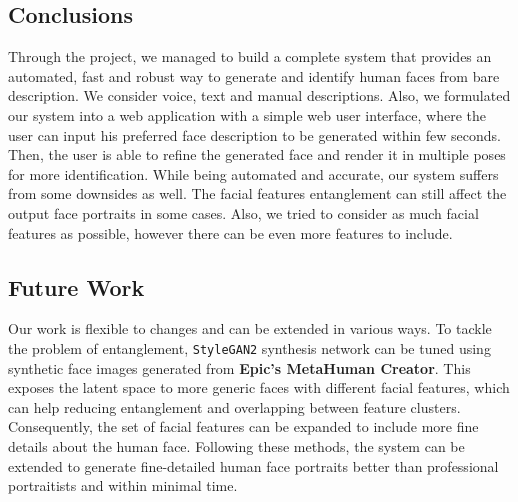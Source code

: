 \subsection{Conclusions}
Through the project, we managed to build a complete system that provides an automated, fast and robust way to generate and identify human faces from bare description. We consider voice, text and manual descriptions. Also, we formulated our system into a web application with a simple web user interface, where the user can input his preferred face description to be generated within few seconds. Then, the user is able to refine the generated face and render it in multiple poses for more identification. While being automated and accurate, our system suffers from some downsides as well. The facial features entanglement can still affect the output face portraits in some cases. Also, we tried to consider as much facial features as possible, however there can be even more features to include.

\subsection{Future Work}
Our work is flexible to changes and can be extended in various ways. To tackle the problem of entanglement, \texttt{StyleGAN2} synthesis network can be tuned using synthetic face images generated from \textbf{Epic's MetaHuman Creator}. This exposes the latent space to more generic faces with different facial features, which can help reducing entanglement and overlapping between feature clusters. Consequently, the set of facial features can be expanded to include more fine details about the human face. Following these methods, the system can be extended to generate fine-detailed human face portraits better than professional portraitists and within minimal time.
